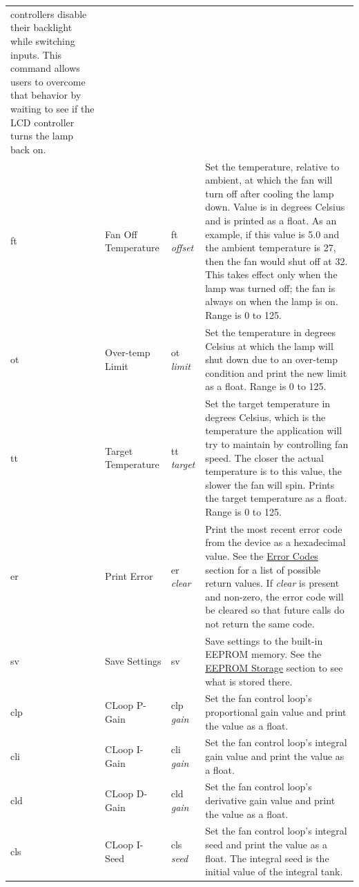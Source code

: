 \documentclass{article}
\begin{document}
\begin{longtable}{l|l|p{}|p{}}
    controllers disable their backlight while switching inputs.  This command allows users to
    overcome that behavior by waiting to see if the LCD controller turns the lamp back on. \\
    ft & Fan Off Temperature & ft \emph{offset} & Set the temperature, relative to ambient, at which
    the fan will turn off after cooling the lamp down.  Value is in degrees Celsius and is printed
    as a float.  As an example, if this value is 5.0 and the ambient temperature is
    27\textcelsius{}, then the fan would shut off at 32\textcelsius{}.  This takes effect only when
    the lamp was turned off; the fan is always on when the lamp is on.  Range is 0 to
    125\textcelsius{}. \\
    ot & Over-temp Limit & ot \emph{limit} & Set the temperature in degrees Celsius at which the
    lamp will shut down due to an over-temp condition and print the new limit as a float. Range is 0
    to 125\textcelsius{}. \\
    tt & Target Temperature & tt \emph{target} & Set the target temperature in degrees Celsius,
    which is the temperature the application will try to maintain by controlling fan speed.  The
    closer the actual temperature is to this value, the slower the fan will spin.  Prints the target
    temperature as a float.  Range is 0 to 125\textcelsius{}. \\
    er & Print Error & er \emph{clear} & Print the most recent error code from the device as a
    hexadecimal value.  See the \hyperref[sssec:FWAppErrCodes]{Error Codes} section for a list of
    possible return values.  If \emph{clear} is present and non-zero, the error code will be cleared
    so that future calls do not return the same code. \\
    sv & Save Settings & sv & Save settings to the built-in EEPROM memory.  See the
    \hyperref[sssec:FWAppStorage]{EEPROM Storage} section to see what is stored there. \\
    clp & CLoop P-Gain & clp \emph{gain} & Set the fan control loop's proportional gain value and
    print the value as a float. \\
    cli & CLoop I-Gain & cli \emph{gain} & Set the fan control loop's integral gain value and
    print the value as a float. \\
    cld & CLoop D-Gain & cld \emph{gain} & Set the fan control loop's derivative gain value and
    print the value as a float. \\
    cls & CLoop I-Seed & cls \emph{seed} & Set the fan control loop's integral seed and
    print the value as a float. The integral seed is the initial value of the integral tank. \\
\end{longtable}
\end{document}
